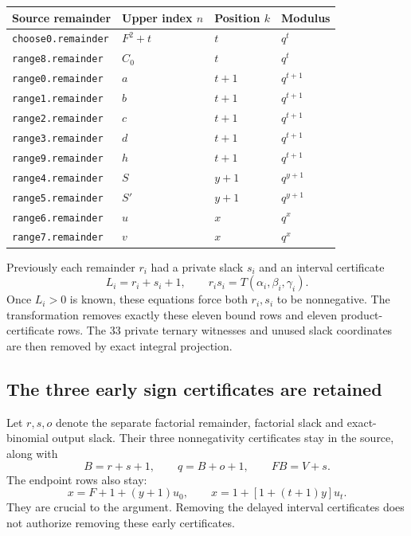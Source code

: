 \documentclass[10pt,letterpaper]{article}
\theoremstyle{definition}\newtheorem{definition}[theorem]{Definition}
\begin{document}
\begin{center}\small
\begin{tabular}{llll}
\toprule
Source remainder & Upper index $n$ & Position $k$ & Modulus\\
\midrule
\texttt{choose0.remainder} &$F^2+t$&$t$&$q^t$\\
\texttt{range8.remainder} &$C_0$&$t$&$q^t$\\
\texttt{range0.remainder} &$a$&$t+1$&$q^{t+1}$\\
\texttt{range1.remainder} &$b$&$t+1$&$q^{t+1}$\\
\texttt{range2.remainder} &$c$&$t+1$&$q^{t+1}$\\
\texttt{range3.remainder} &$d$&$t+1$&$q^{t+1}$\\
\texttt{range9.remainder} &$h$&$t+1$&$q^{t+1}$\\
\texttt{range4.remainder} &$S$&$y+1$&$q^{y+1}$\\
\texttt{range5.remainder} &$S'$&$y+1$&$q^{y+1}$\\
\texttt{range6.remainder} &$u$&$x$&$q^x$\\
\texttt{range7.remainder} &$v$&$x$&$q^x$\\
\bottomrule
\end{tabular}
\end{center}

Previously each remainder $r_i$ had a private slack $s_i$ and an interval
certificate
\begin{equation}\label{eq:oldinterval}
 L_i=r_i+s_i+1,\qquad r_i s_i=T(\alpha_i,\beta_i,\gamma_i).
\end{equation}
Once $L_i>0$ is known, these equations force both $r_i,s_i$ to be
nonnegative. The transformation removes exactly these eleven bound rows
and eleven product-certificate rows. The 33 private ternary witnesses
and unused slack coordinates are then removed by exact integral projection.

\subsection{The three early sign certificates are retained}

Let $r,s,o$ denote the separate factorial remainder, factorial slack and
exact-binomial output slack. Their three nonnegativity certificates stay
in the source, along with
\begin{equation}\label{eq:early}
 B=r+s+1,\qquad q=B+o+1,\qquad FB=V+s.
\end{equation}
The endpoint rows also stay:
\begin{equation}\label{eq:endpoints}
 x=F+1+(y+1)u_0,
 \qquad x=1+[1+(t+1)y]u_t.
\end{equation}
They are crucial to the argument. Removing the delayed interval certificates
does not authorize removing these early certificates.
\end{document}
